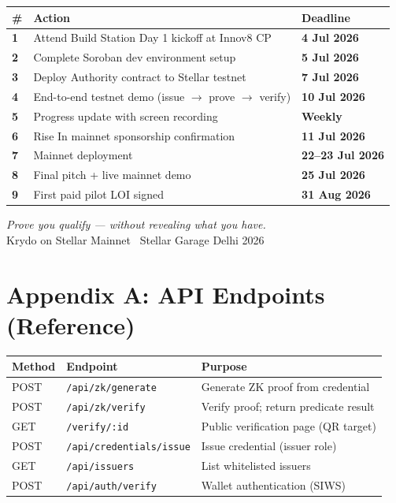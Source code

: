 \documentclass[11pt,a4paper]{article}
\newcommand{\krydo}{\textsf{Krydo}}
\newcommand{\stellar}{\textsf{Stellar}}
\begin{document}
\begin{table}[H]
  \centering
  \renewcommand{\arraystretch}{1.2}
  \begin{tabularx}{\textwidth}{@{}>{\bfseries}p{0.5cm} X >{\bfseries}p{2.2cm}@{}}
    \toprule
    \# & Action & Deadline \\
    \midrule
    1 & Attend Build Station Day 1 kickoff at Innov8 CP & 4 Jul 2026 \\
    2 & Complete Soroban dev environment setup & 5 Jul 2026 \\
    3 & Deploy Authority contract to Stellar testnet & 7 Jul 2026 \\
    4 & End-to-end testnet demo (issue $\rightarrow$ prove $\rightarrow$ verify) & 10 Jul 2026 \\
    5 & Progress update with screen recording & Weekly \\
    6 & Rise In mainnet sponsorship confirmation & 11 Jul 2026 \\
    7 & Mainnet deployment & 22--23 Jul 2026 \\
    8 & Final pitch + live mainnet demo & 25 Jul 2026 \\
    9 & First paid pilot LOI signed & 31 Aug 2026 \\
    \bottomrule
  \end{tabularx}
\end{table}

\vspace{1em}
\begin{keybox}
  \centering
  \large\textit{Prove you qualify --- without revealing what you have.}\\[0.4em]
  \normalsize \krydo{} on \stellar{} Mainnet \textbar\ Stellar Garage Delhi 2026
\end{keybox}

\appendix
\section{Appendix A: API Endpoints (Reference)}

\begin{table}[H]
  \centering
  \small
  \renewcommand{\arraystretch}{1.15}
  \begin{tabularx}{\textwidth}{@{}ll X@{}}
    \toprule
    \textbf{Method} & \textbf{Endpoint} & \textbf{Purpose} \\
    \midrule
    POST & \texttt{/api/zk/generate} & Generate ZK proof from credential \\
    POST & \texttt{/api/zk/verify} & Verify proof; return predicate result \\
    GET & \texttt{/verify/:id} & Public verification page (QR target) \\
    POST & \texttt{/api/credentials/issue} & Issue credential (issuer role) \\
    GET & \texttt{/api/issuers} & List whitelisted issuers \\
    POST & \texttt{/api/auth/verify} & Wallet authentication (SIWS) \\
    \bottomrule
  \end{tabularx}
\end{table}
\end{document}
